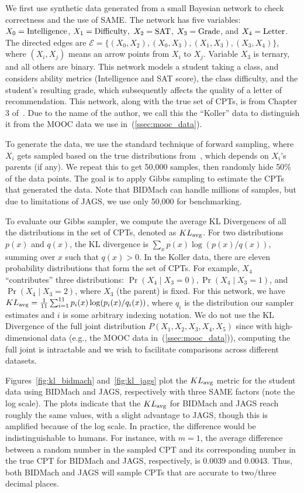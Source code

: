 \documentclass{article} %
\begin{document}
We first use synthetic data generated from a small Bayesian network to check correctness
and the use of SAME. The network has five variables: $X_0 = {\rm Intelligence}$, $X_1 =
{\rm Difficulty},$ $X_2 = {\rm SAT}$, $X_3 = {\rm Grade}$, and $X_4 = {\rm Letter}$. The directed
edges are $\mathcal{E} = \{(X_0, X_2), (X_0, X_3), (X_1,X_3), (X_3,X_4)\}$, where $(X_i,X_j)$ means
an arrow points from $X_i$ to $X_j$.  Variable $X_3$ is ternary, and all others are binary. This
network models a student taking a class, and considers ability metrics (Intelligence and SAT score),
the class difficulty, and the student's resulting grade, which subsequently affects the quality of a
letter of recommendation. This network, along with the true set of CPTs, is from Chapter 3
of~\citet{Koller2009}. Due to the name of the author, we call this the ``Koller'' data to
distinguish it from the MOOC data we use in~(\ref{ssec:mooc_data}).

To generate the data, we use the standard technique of forward sampling, where $X_i$ gets sampled
based on the true distributions from~\citet{Koller2009}, which depends on $X_i$'s parents (if any).
We repeat this to get 50,000 samples, then randomly hide 50\% of the data points. The goal is to
apply Gibbs sampling to estimate the CPTs that generated the data. Note that BIDMach can handle
millions of samples, but due to limitations of JAGS, we use only 50,000 for benchmarking.

To evaluate our Gibbs sampler, we compute the average KL Divergences of all the distributions in the
set of CPTs, denoted as $KL_{\rm avg}$.  For two distributions $p(x)$ and $q(x)$, the KL divergence
is $\sum_x p(x) \log(p(x)/q(x))$, summing over $x$ such that $q(x) > 0$.  In the Koller data, there
are eleven probability distributions that form the set of CPTs. For example, $X_4$ ``contributes''
three distributions: $\Pr(X_4 \mid X_3 = 0), \Pr(X_4 \mid X_3 = 1)$, and $\Pr(X_4 \mid X_3 = 2)$,
where $X_3$ (the parent) is fixed. For this network, we have $KL_{\rm avg} = \frac{1}{11}
\sum_{i=1}^{11} p_i(x) \log(p_i(x)/q_i(x))$, where $q_i$ is the distribution our sampler estimates
and $i$ is some arbitrary indexing notation. We do not use the KL Divergence of the full joint
distribution $P(X_1,X_2,X_3,X_4,X_5)$ since with high-dimensional data (e.g., the MOOC data
in~(\ref{ssec:mooc_data})), computing the full joint is intractable and we wish to facilitate
comparisons across different datasets.

Figures~\ref{fig:kl_bidmach} and~\ref{fig:kl_jags} plot the $KL_{\rm avg}$ metric for the student
data using BIDMach and JAGS, respectively with three SAME factors (note the log scale). The plots
indicate that the $KL_{\rm avg}$ for BIDMach and JAGS reach roughly the same values, with a slight
advantage to JAGS, though this is amplified because of the log scale. In practice, the difference
would be indistinguishable to humans. For instance, with $m=1$, the average difference between a
random number in the sampled CPT and its corresponding number in the true CPT for BIDMach and JAGS,
respectively, is 0.0039 and 0.0043. Thus, both BIDMach and JAGS will sample CPTs that are accurate
to two/three decimal places.
\end{document}

